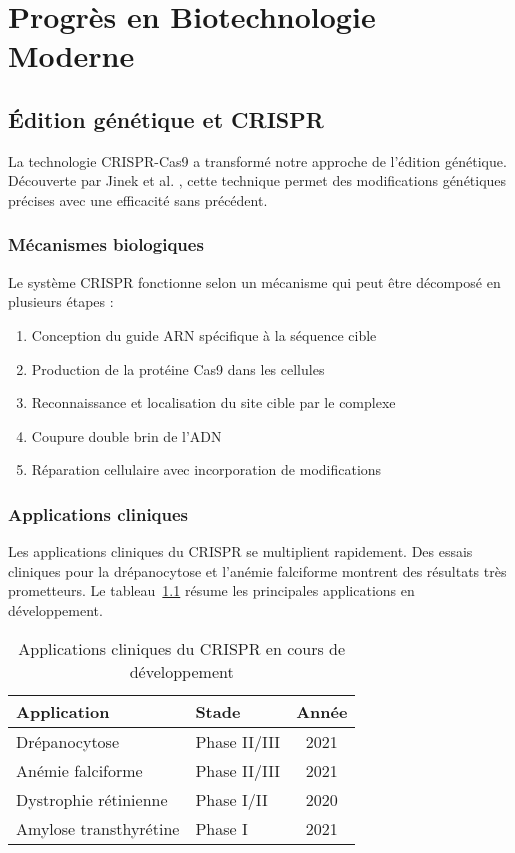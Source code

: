 \documentclass[12pt,a4paper,twoside,openright,openany]{book}
\begin{document}
	\chapter{Progrès en Biotechnologie Moderne}
	\label{ch:biotech}
	
	\section{Édition génétique et CRISPR}
	
	La technologie CRISPR-Cas9 a transformé notre approche de l'édition génétique. Découverte par Jinek et al. \cite{Jinek2012}, cette technique permet des modifications génétiques précises avec une efficacité sans précédent.
	
	\subsection{Mécanismes biologiques}
	
	Le système CRISPR fonctionne selon un mécanisme qui peut être décomposé en plusieurs étapes :
	
	\begin{enumerate}
		\item Conception du guide ARN spécifique à la séquence cible
		\item Production de la protéine Cas9 dans les cellules
		\item Reconnaissance et localisation du site cible par le complexe
		\item Coupure double brin de l'ADN
		\item Réparation cellulaire avec incorporation de modifications
	\end{enumerate}
	
	\subsection{Applications cliniques}
	
	Les applications cliniques du CRISPR se multiplient rapidement. Des essais cliniques pour la drépanocytose et l'anémie falciforme \cite{Gillmore2021} montrent des résultats très prometteurs. Le tableau~\ref{tab:crispr_apps} résume les principales applications en développement.
	
	\begin{table}[H]
		\centering
		\begin{tabular}{|l|l|c|}
			\hline
			\textbf{Application} & \textbf{Stade} & \textbf{Année} \\
			\hline
			Drépanocytose & Phase II/III & 2021 \\
			\hline
			Anémie falciforme & Phase II/III & 2021 \\
			\hline
			Dystrophie rétinienne & Phase I/II & 2020 \\
			\hline
			Amylose transthyrétine & Phase I & 2021 \\
			\hline
		\end{tabular}
		\caption{Applications cliniques du CRISPR en cours de développement}
		\label{tab:crispr_apps}
	\end{table}
	
\end{document}
